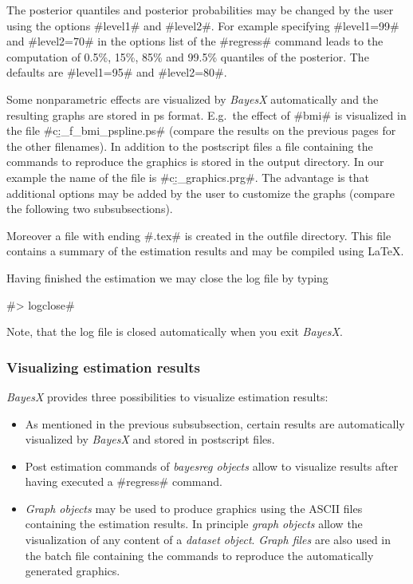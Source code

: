 The posterior quantiles and posterior probabilities may be changed
by the user using the options #level1# and #level2#. For example
specifying #level1=99# and #level2=70# in the options list of the
#regress# command leads to the computation of 0.5\%, 15\%, 85\%
and 99.5\% quantiles of the posterior. The defaults are
#level1=95# and #level2=80#.

Some nonparametric effects are visualized by {\em BayesX}
automatically and the resulting graphs are stored in ps format.
E.g.~the effect of #bmi# is visualized in the file
#c:\data\b_f_bmi_pspline.ps# (compare the results on the previous
pages for the other filenames). In addition to the postscript
files a file containing the commands to reproduce the graphics is
stored in the output directory. In our example the name of the
file is #c:\data\b_graphics.prg#. The advantage is that additional
options may be added by the user to customize the graphs (compare
the following two subsubsections).

Moreover a file with ending #.tex# is created in the outfile
directory. This file contains a summary of the estimation results
and may be compiled using \LaTeX.

Having finished the estimation we may close the log file by typing

#> logclose#

Note, that the log file is closed automatically when you exit {\em
BayesX}.

\subsubsection{Visualizing estimation results}\label{zambia_mcmc_visual}

{\em BayesX} provides three possibilities to visualize estimation
results:
\begin{itemize}
\item As mentioned in the previous subsubsection, certain results are
automatically visualized by {\em BayesX} and stored in postscript
files.
\item Post estimation commands of {\em bayesreg objects} allow to
visualize results after having executed a #regress# command.
\item {\em Graph objects} may be used to produce graphics using the ASCII files containing the estimation results.
In principle {\em graph objects} allow the visualization of any
content of a {\em dataset object}. {\em Graph files} are also used
in the batch file containing the commands to reproduce the
automatically generated graphics.
\end{itemize}

